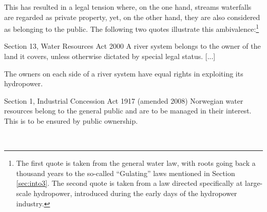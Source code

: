 

This has resulted in a legal tension where, on the one hand, streams waterfalls are regarded as private property, yet, on the other hand, they are also considered as belonging to the public. The following two quotes illustrate this ambivalence:\footnote{The first quote is taken from the general water law, with roots going back a thousand years to the so-called ``Gulating'' laws mentioned in Section \ref{sec:into3}. The second quote is taken from a law directed specifically at large-scale hydropower, introduced during the early days of the hydropower industry.}

{\begin{minipage}[t]{16em}
 \begin{aquote}{\tiny Section 13, Water Resources Act 2000} \footnotesize A river system belongs to the owner of the land it covers, unless otherwise dictated by special legal status. [...]

The owners on each side of a river system have equal rights in exploiting its hydropower.
\end{aquote}  
\end{minipage}}
{\begin{minipage}[t]{22em}
\begin{aquote}{\tiny Section 1, Industrial Concession Act 1917 (amended 2008)} \footnotesize Norwegian water resources belong to the general public and are to be managed in their interest. This is to be ensured by public ownership.
\end{aquote}
\end{minipage}} \\

